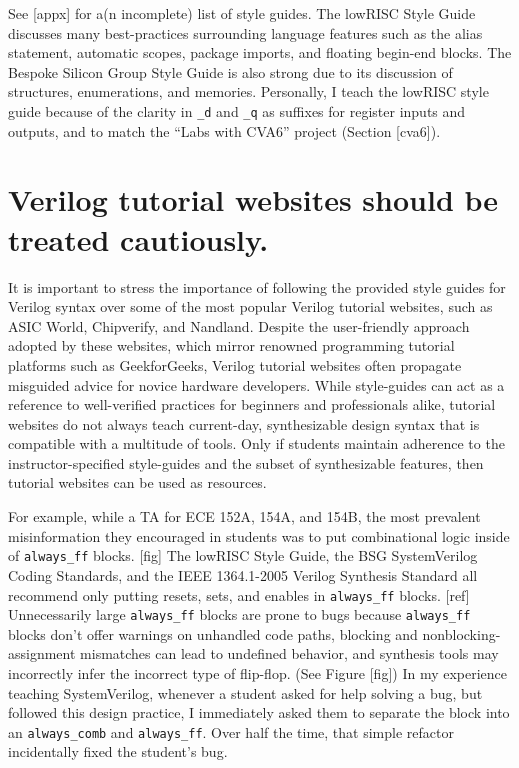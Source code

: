 See [appx] for a(n incomplete) list of style guides. The lowRISC Style Guide discusses many best-practices surrounding language features such as the alias statement, automatic scopes, package imports, and floating begin-end blocks. The Bespoke Silicon Group Style Guide is also strong due to its discussion of structures, enumerations, and memories. Personally, I teach the lowRISC style guide because of the clarity in \texttt{_d} and \texttt{_q} as suffixes for register inputs and outputs, and to match the ``Labs with CVA6'' project (Section [cva6]).

\section{Verilog tutorial websites should be treated cautiously.}

It is important to stress the importance of following the provided style guides for Verilog syntax over some of the most popular Verilog tutorial websites, such as ASIC World, Chipverify, and Nandland. Despite the user-friendly approach adopted by these websites, which mirror renowned programming tutorial platforms such as GeekforGeeks, Verilog tutorial websites often propagate misguided advice for novice hardware developers. While style-guides can act as a reference to well-verified practices for beginners and professionals alike, tutorial websites do not always teach current-day, synthesizable design syntax that is compatible with a multitude of tools. Only if students maintain adherence to the instructor-specified style-guides and the subset of synthesizable features, then tutorial websites can be used as resources.

For example, while a TA for ECE 152A, 154A, and 154B, the most prevalent misinformation they encouraged in students was to put combinational logic inside of \texttt{always_ff} blocks. [fig] The lowRISC Style Guide, the BSG SystemVerilog Coding Standards, and the IEEE 1364.1-2005 Verilog Synthesis Standard all recommend only putting resets, sets, and enables in \texttt{always_ff} blocks. [ref] Unnecessarily large \texttt{always_ff} blocks are prone to bugs because \texttt{always_ff} blocks don't offer warnings on unhandled code paths, blocking and nonblocking-assignment mismatches can lead to undefined behavior, and synthesis tools may incorrectly infer the incorrect type of flip-flop. (See Figure [fig]) In my experience teaching SystemVerilog, whenever a student asked for help solving a bug, but followed this design practice, I immediately asked them to separate the block into an \texttt{always_comb} and \texttt{always_ff}. Over half the time, that simple refactor incidentally fixed the student's bug.

